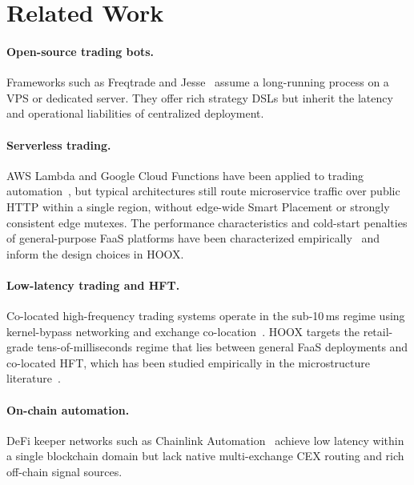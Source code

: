 \section{Related Work}
\label{sec:related}

\paragraph{Open-source trading bots.} Frameworks such as Freqtrade and Jesse~\cite{freqtrade,jesse} assume a long-running process on a VPS or dedicated server. They offer rich strategy DSLs but inherit the latency and operational liabilities of centralized deployment.

\paragraph{Serverless trading.} AWS Lambda and Google Cloud Functions have been applied to trading automation~\cite{baldini2017serverless}, but typical architectures still route microservice traffic over public HTTP within a single region, without edge-wide Smart Placement or strongly consistent edge mutexes. The performance characteristics and cold-start penalties of general-purpose FaaS platforms have been characterized empirically~\cite{wang2018peeking,lloyd2018serverless,shahrad2020serverless} and inform the design choices in \textsc{HOOX}.

\paragraph{Low-latency trading and HFT.} Co-located high-frequency trading systems operate in the sub-10\,ms regime using kernel-bypass networking and exchange co-location~\cite{arnold2010latency,budish2015hft,hasbrouck2013lowlatency}. \textsc{HOOX} targets the retail-grade tens-of-milliseconds regime that lies between general FaaS deployments and co-located HFT, which has been studied empirically in the microstructure literature~\cite{hasbrouck2007empirical,hendershott2011does}.

\paragraph{On-chain automation.} DeFi keeper networks such as Chainlink Automation~\cite{chainlink-keepers} achieve low latency within a single blockchain domain but lack native multi-exchange CEX routing and rich off-chain signal sources.

